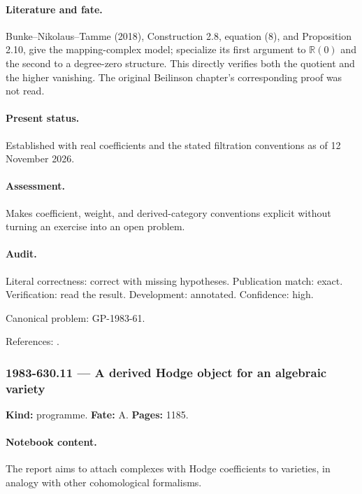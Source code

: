 \paragraph{Literature and fate.} Bunke–Nikolaus–Tamme (2018), Construction 2.8, equation (8), and Proposition 2.10, give the mapping-complex model; specialize its first argument to \(\mathbb R(0)\) and the second to a degree-zero structure. This directly verifies both the quotient and the higher vanishing. The original Beilinson chapter’s corresponding proof was not read.

\paragraph{Present status.} Established with real coefficients and the stated filtration conventions as of 12 November 2026.

\paragraph{Assessment.} Makes coefficient, weight, and derived-category conventions explicit without turning an exercise into an open problem.

\paragraph{Audit.} Literal correctness: correct with missing hypotheses. Publication match: exact. Verification: read the result. Development: annotated. Confidence: high.

\noindent Canonical problem: GP-1983-61.\par

\noindent References: \citep{beilinson1986absolute,bunkenikolaustamme2018regulator}.\par

\subsubsection{1983-630.11 --- A derived Hodge object for an algebraic variety}

\label{item:1983-630.11}

\noindent\textbf{Kind:} programme. \textbf{Fate:} A. \textbf{Pages:} 1185.\par

\paragraph{Notebook content.} The report aims to attach complexes with Hodge coefficients to varieties, in analogy with other cohomological formalisms.

